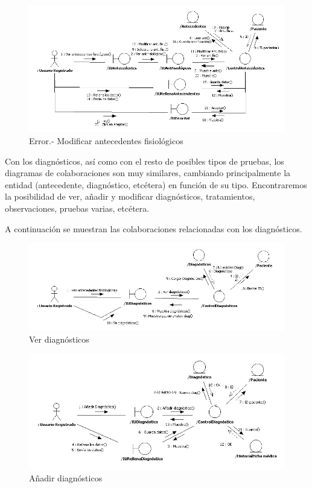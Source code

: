 		\begin{figure}[H]
		  \centering
		    \includegraphics[width=16cm]{img/jpg/colaboraciones/36_ModificarAntecedenteError.jpg}
		  \caption{Error.- Modificar antecedentes fisiológicos}
		  \label{fig:col_ant_fis_fm_modificar_err}
		\end{figure}
		
		
		\newpage
		Con los diagnósticos, así como con el resto de posibles tipos de pruebas, los diagramas de colaboraciones son muy similares, cambiando principalmente la entidad (antecedente, diagnóstico, etcétera) en función de su tipo. Encontraremos la posibilidad de ver, añadir y modificar diagnósticos, tratamientos, observaciones, pruebas varias, etcétera.
		
		A continuación se muestran las colaboraciones relacionadas con los diagnósticos.
		\begin{figure}[H]
		  \centering
		    \includegraphics[width=16cm]{img/jpg/colaboraciones/37_VerDiagnosticos.jpg}
		  \caption{Ver diagnósticos}
		  \label{fig:col_diag_fm}
		\end{figure}
		
		\begin{figure}[H]
		  \centering
		    \includegraphics[width=16cm]{img/jpg/colaboraciones/38_AnadirDiagnostico.jpg}
		  \caption{Añadir diagnósticos}
		  \label{fig:col_diag_fm_anadir}
		\end{figure}
		
